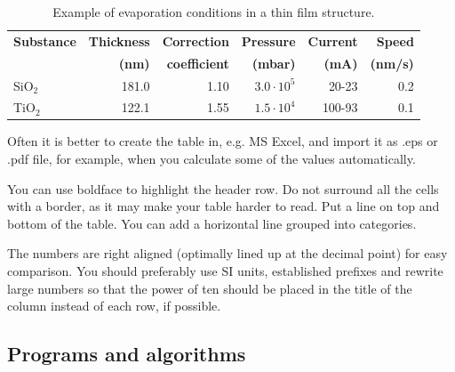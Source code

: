 \begin{table}[ht]
  \small
  \begin{center}
    \caption{Example of evaporation conditions in a thin film structure.}
    \label{tab:thin_film}
    \begin{tabular}{l | r r r r r}
      \hline
      \textbf{Substance} & \textbf{Thickness}& \textbf{Correction } & \textbf{Pressure}  & \textbf{Current} & \textbf{Speed} \\
                         & \textbf{(nm)}     & \textbf{coefficient} & \textbf{(mbar)}    & \textbf{(mA)}    & \textbf{(nm/s)} \\
      \hline 
      SiO$_2$	& 181.0	& 1.10	& $3.0\cdot10^5$	& 20-23	 &0.2 \\
      TiO$_2$	& 122.1	& 1.55	& $1.5\cdot10^4$	& 100-93 &0.1 \\
      \hline
    \end{tabular}
  \end{center}
\end{table}


Often it is better to create the table in, e.g. MS Excel, and import
it as .eps or .pdf file, for example, when you calculate some of the
values automatically.

You can use boldface to highlight the header row. Do not surround all 
the cells with a border, as it may make your table harder to read. 
Put a line on top and bottom of the table. You can add a horizontal line
grouped into categories.

The numbers are right aligned (optimally lined up at the decimal
point) for easy comparison. You should preferably use SI units,
established prefixes and rewrite large numbers so that the power of
ten should be placed in the title of the column instead of each row,
if possible. 


\subsection{Programs and algorithms}

